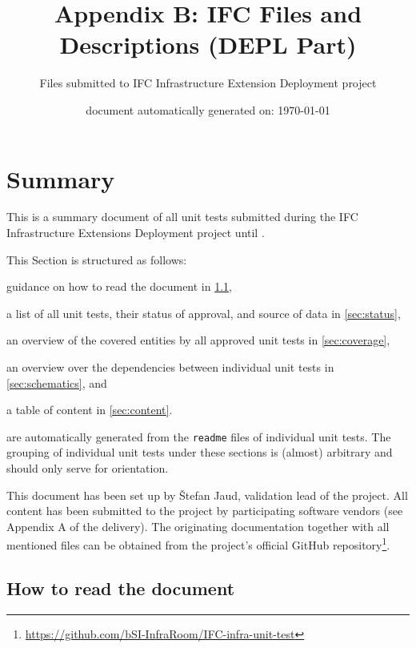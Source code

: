 \documentclass{scrartcl}
\title{Appendix B: IFC Files and Descriptions (DEPL Part)}
\author{Files submitted to IFC Infrastructure Extension Deployment project}
\date{document automatically generated on: \today}
\begin{document}
\maketitle
{}

\section{Summary}
\label{sec:summary}

This is a summary document of all unit tests submitted during the IFC Infrastructure Extensions Deployment project until .

This Section is structured as follows:
\begin{compactitem}
  \item guidance on how to read the document in \cref{sec:how_to},
  \item a list of all unit tests, their status of approval, and source of data in \cref{sec:status},
  \item an overview of the covered entities by all approved unit tests in \cref{sec:coverage},
  \item an overview over the dependencies between individual unit tests in \cref{sec:schematics}, and
  \item a table of content in \cref{sec:content}.
\end{compactitem}
 are automatically generated from the \texttt{readme} files of individual unit tests.
The grouping of individual unit tests under these sections is (almost) arbitrary and should only serve for orientation.

This document has been set up by \v{S}tefan Jaud, validation lead of the project.
All content has been submitted to the project by participating software vendors (see Appendix A of the delivery).
The originating documentation together with all mentioned files can be obtained
 from the project's official GitHub repository\footnote{\url{https://github.com/bSI-InfraRoom/IFC-infra-unit-test}}.

\subsection{How to read the document}
\label{sec:how_to}
\end{document}
